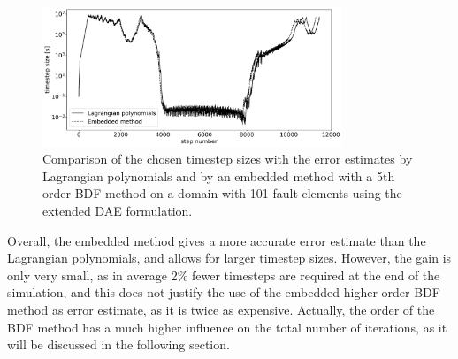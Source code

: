 \begin{figure}[H]
	\centering
	\includegraphics[width=0.8\textwidth]{images/TANDEMTimeAnalysisDifferentBDFOrdersEmbedded_vs_Lagrange_ExtendedDAE_Size101.png}
	\caption{Comparison of the chosen timestep sizes with the error estimates by Lagrangian polynomials and by an embedded method with a 5th order BDF method on a domain with 101 fault elements using the extended DAE formulation. }
	\label{fig:BDFOrders_Lagrange_vs_Embedded_extended_DAE}
\end{figure}
Overall, the embedded method gives a more accurate error estimate than the Lagrangian polynomials, and allows for larger timestep sizes. However, the gain is only very small, as in average 2\% fewer timesteps are required at the end of the simulation, and this does not justify the use of the embedded higher order BDF method as error estimate, as it is twice as expensive. Actually, the order of the BDF method has a much higher influence on the total number of iterations, as it will be discussed in the following section.


